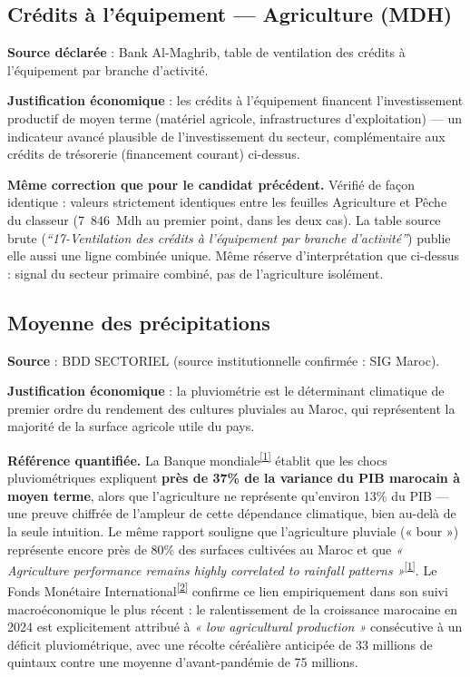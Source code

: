 \documentclass[11pt,a4paper]{article}
\newcommand{\cit}[1]{\textsuperscript{\hyperlink{ref#1}{[#1]}}}
\begin{document}
\subsection{Crédits à l'équipement --- Agriculture (MDH)}

\textbf{Source déclarée} : Bank Al-Maghrib, table de ventilation des crédits à l'équipement par branche d'activité.

\textbf{Justification économique} : les crédits à l'équipement financent l'investissement productif de moyen terme (matériel agricole, infrastructures d'exploitation) --- un indicateur avancé plausible de l'investissement du secteur, complémentaire aux crédits de trésorerie (financement courant) ci-dessus.

\begin{alertebox}
\textbf{Même correction que pour le candidat précédent.} Vérifié de façon identique : valeurs strictement identiques entre les feuilles Agriculture et Pêche du classeur (7~846~Mdh au premier point, dans les deux cas). La table source brute (\textit{``17-Ventilation des crédits à l'équipement par branche d'activité''}) publie elle aussi une ligne combinée unique. Même réserve d'interprétation que ci-dessus : signal du secteur primaire combiné, pas de l'agriculture isolément.
\end{alertebox}

\subsection{Moyenne des précipitations}

\textbf{Source} : BDD SECTORIEL (source institutionnelle confirmée : SIG Maroc).

\textbf{Justification économique} : la pluviométrie est le déterminant climatique de premier ordre du rendement des cultures pluviales au Maroc, qui représentent la majorité de la surface agricole utile du pays.

\begin{sourcebox}
\textbf{Référence quantifiée.} La Banque mondiale\cit{1} établit que les chocs pluviométriques expliquent \textbf{près de 37\% de la variance du PIB marocain à moyen terme}, alors que l'agriculture ne représente qu'environ 13\% du PIB --- une preuve chiffrée de l'ampleur de cette dépendance climatique, bien au-delà de la seule intuition. Le même rapport souligne que l'agriculture pluviale (« bour ») représente encore près de 80\% des surfaces cultivées au Maroc et que \textit{« Agriculture performance remains highly correlated to rainfall patterns »}\cit{1}. Le Fonds Monétaire International\cit{2} confirme ce lien empiriquement dans son suivi macroéconomique le plus récent : le ralentissement de la croissance marocaine en 2024 est explicitement attribué à \textit{« low agricultural production »} consécutive à un déficit pluviométrique, avec une récolte céréalière anticipée de 33 millions de quintaux contre une moyenne d'avant-pandémie de 75 millions.
\end{sourcebox}
\end{document}
